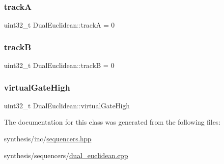 \mbox{\label{class_dual_euclidean_a9c9f254af7b89c373ce03d8b857b2477}} 
\subsubsection{\texorpdfstring{trackA}{trackA}}
{\footnotesize\ttfamily uint32\+\_\+t Dual\+Euclidean\+::trackA = 0}

\mbox{\label{class_dual_euclidean_a9c2333d598bf61280491b69b2e01e8e1}} 
\subsubsection{\texorpdfstring{trackB}{trackB}}
{\footnotesize\ttfamily uint32\+\_\+t Dual\+Euclidean\+::trackB = 0}

\mbox{\label{class_dual_euclidean_a178d24471a08efe6149529d86b05fa1d}} 
\subsubsection{\texorpdfstring{virtual\+Gate\+High}{virtualGateHigh}}
{\footnotesize\ttfamily uint32\+\_\+t Dual\+Euclidean\+::virtual\+Gate\+High}



The documentation for this class was generated from the following files\+:\begin{DoxyCompactItemize}
\item 
synthesis/inc/\mbox{\hyperlink{sequencers_8hpp}{sequencers.\+hpp}}\item 
synthesis/sequencers/\mbox{\hyperlink{dual__euclidean_8cpp}{dual\+\_\+euclidean.\+cpp}}\end{DoxyCompactItemize}

